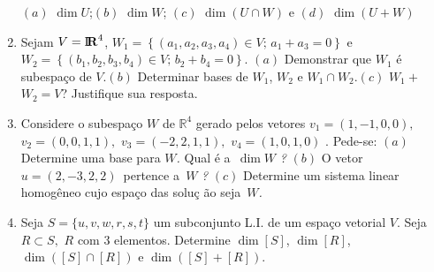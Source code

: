 \documentclass{report}
\begin{document}
\begin{Exercise}
\begin{enumerate}
$(a)$ $\dim U$;\quad $(b)$ $\dim W$; $(c)$ $\dim (U\cap W)$ e
$(d)$ $\dim (U+W)$


\item \label{23lista3} Sejam $V=%
\mbox{${\rm I}\!\mbox{\boldmath $ {\rm R}$}$}%
^{4}$, $W_{1}=\left\{ \left( a_{1},a_{2},a_{3},a_{4}\right) \in
V;\,a_{1}+a_{3}=0\right\} $ e $W_{2}=\left\{ \left(
b_{1},b_{2},b_{3},b_{4}\right) \in V;\,b_{2}+b_{4}=0\right\} $.
\newline $(a)$ Demonstrar que $W_{1}$ \'{e} subespa\c{c}o de
$V$.\newline $(b)$ Determinar bases de $W_{1}$, $W_{2}$ e
$W_{1}\cap W_{2}$.\newline $(c)$ $W_{1}+$ $W_{2}=V$? Justifique
sua resposta.


\item \label{24lista3} Considere o subespa\c{c}o $W$ de
$\mathbb{R}^{4}$ gerado pelos
vetores $v_{1}=\left( 1,-1,0,0\right) ,$ $v_{2}=\left( 0,0,1,1\right) ,$ $%
v_{3}=\left( -2,2,1,1\right) ,$ $v_{4}=\left( 1,0,1,0\right) $ . Pede-se:%
\newline
$(a)$ Determine uma base para $W$\textit{. } Qual \'{e} a\textit{\ }$\dim W$%
\textit{?}\newline
$(b)$ O vetor\textit{\ }$u=\left( 2,-3,2,2\right) $\ pertence a\textit{\ }$W$%
\textit{?}\newline
$(c)$ Determine um sistema linear homog\^{e}neo cujo espa\c{c}o das solu\c{c}%
\~{a}o seja\textit{\ }$W$\textit{.}


\item \label{25lista3} Seja $S=\{u,v,w,r,s,t\}$ um subconjunto
L.I. de um espa\c{c}o vetorial $V$. Seja $R\subset S,$ $R$ com $3$
elementos. Determine $\dim \left[ S\right] $, $\dim \left[
R\right] $, $\dim \left( \left[ S\right] \cap \left[ R\right]
\right) $ e $\dim \left( \left[ S\right] +\left[ R\right] \right)
.$



\end{enumerate}
\end{Exercise}
\end{document}
